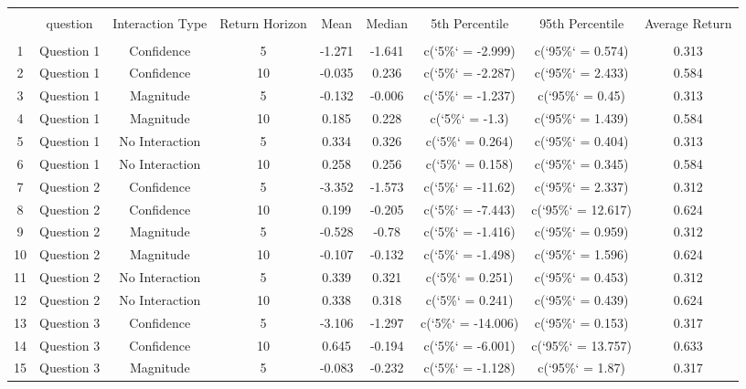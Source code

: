 
\begin{table}[!htbp] \centering 
  \caption{} 
  \label{} 
\begin{tabular}{@{\extracolsep{5pt}} ccccccccc} 
\\[-1.8ex]\hline 
\hline \\[-1.8ex] 
 & question & Interaction Type & Return Horizon & Mean & Median & 5th Percentile & 95th Percentile & Average Return \\ 
\hline \\[-1.8ex] 
1 & Question 1 & Confidence & 5 & -1.271 & -1.641 & c(`5\%` = -2.999) & c(`95\%` = 0.574) & 0.313 \\ 
2 & Question 1 & Confidence & 10 & -0.035 & 0.236 & c(`5\%` = -2.287) & c(`95\%` = 2.433) & 0.584 \\ 
3 & Question 1 & Magnitude & 5 & -0.132 & -0.006 & c(`5\%` = -1.237) & c(`95\%` = 0.45) & 0.313 \\ 
4 & Question 1 & Magnitude & 10 & 0.185 & 0.228 & c(`5\%` = -1.3) & c(`95\%` = 1.439) & 0.584 \\ 
5 & Question 1 & No Interaction & 5 & 0.334 & 0.326 & c(`5\%` = 0.264) & c(`95\%` = 0.404) & 0.313 \\ 
6 & Question 1 & No Interaction & 10 & 0.258 & 0.256 & c(`5\%` = 0.158) & c(`95\%` = 0.345) & 0.584 \\ 
7 & Question 2 & Confidence & 5 & -3.352 & -1.573 & c(`5\%` = -11.62) & c(`95\%` = 2.337) & 0.312 \\ 
8 & Question 2 & Confidence & 10 & 0.199 & -0.205 & c(`5\%` = -7.443) & c(`95\%` = 12.617) & 0.624 \\ 
9 & Question 2 & Magnitude & 5 & -0.528 & -0.78 & c(`5\%` = -1.416) & c(`95\%` = 0.959) & 0.312 \\ 
10 & Question 2 & Magnitude & 10 & -0.107 & -0.132 & c(`5\%` = -1.498) & c(`95\%` = 1.596) & 0.624 \\ 
11 & Question 2 & No Interaction & 5 & 0.339 & 0.321 & c(`5\%` = 0.251) & c(`95\%` = 0.453) & 0.312 \\ 
12 & Question 2 & No Interaction & 10 & 0.338 & 0.318 & c(`5\%` = 0.241) & c(`95\%` = 0.439) & 0.624 \\ 
13 & Question 3 & Confidence & 5 & -3.106 & -1.297 & c(`5\%` = -14.006) & c(`95\%` = 0.153) & 0.317 \\ 
14 & Question 3 & Confidence & 10 & 0.645 & -0.194 & c(`5\%` = -6.001) & c(`95\%` = 13.757) & 0.633 \\ 
15 & Question 3 & Magnitude & 5 & -0.083 & -0.232 & c(`5\%` = -1.128) & c(`95\%` = 1.87) & 0.317 \\ 

\end{tabular}
\end{table}
